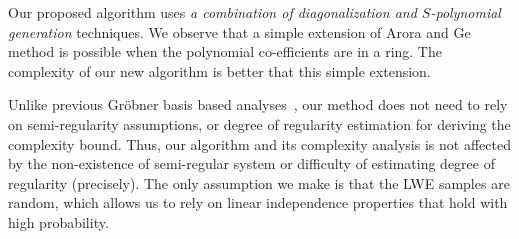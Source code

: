 \begin{table}[htbp]
    \centering
    \renewcommand{\arraystretch}{1.8}
    \vspace{0.2cm} 
    \caption{Let $N, n, q \in \Z_{>0}$. The table shows the complexity of our algebraic attack on the three LWE variants with bounded errors (e.g., error entries/coefficients drawn from a set of size $d$). Here, $\omega$ is the linear algebra constant ($2 \le \omega < 3$) and the complexity is measured in the number of scalar multiplications in $\Z_q$.}\label{tab:comparison}
\end{table}


Our proposed algorithm uses \emph{a combination of diagonalization and $S$-polynomial generation} techniques. We observe that a simple extension of Arora and Ge method \cite{ICALP:AroGe11} is possible when the polynomial co-efficients are in a ring. The complexity of our new algorithm is better that this simple extension.  

Unlike previous Gr{\"o}bner basis based analyses~\cite{EPRINT:ACFP14,EPRINT:Steiner24b}, our method does not need to rely on semi-regularity assumptions, or degree of regularity estimation for deriving the complexity bound. Thus, our algorithm and its complexity analysis is not affected by the non-existence of semi-regular system or difficulty of estimating degree of regularity (precisely). The only assumption we make is that the LWE samples are random, which allows us to rely on linear independence properties that hold with high probability. %

